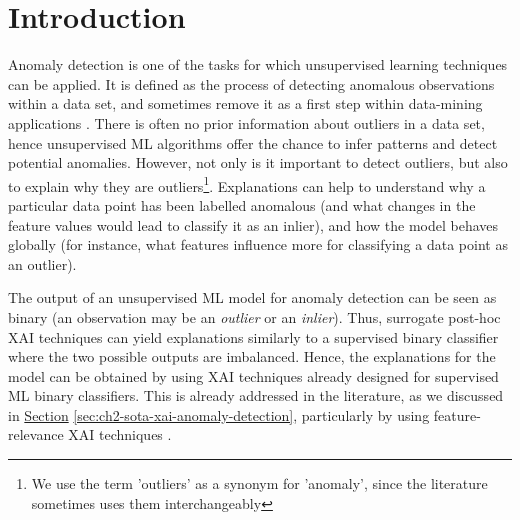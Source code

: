 
\section{Introduction}\label{sec:RuleExtractionIntroduction}
Anomaly detection is one of the tasks for which unsupervised learning techniques can be applied. It is defined as the process of detecting anomalous observations within a data set, and sometimes remove it as a first step within data-mining applications \parencite{hodge2004survey}. There is often no prior information about outliers in a data set, hence unsupervised ML algorithms offer the chance to infer patterns and detect potential anomalies. However, not only is it important to detect outliers, but also to explain why they are outliers\footnote{We use the term 'outliers' as a synonym for 'anomaly', since the literature sometimes uses them interchangeably}. Explanations can help to understand why a particular data point has been labelled anomalous (and what changes in the feature values would lead to classify it as an inlier), and how the model behaves globally (for instance, what features influence more for classifying a data point as an outlier).

The output of an unsupervised ML model for anomaly detection can be seen as binary (an observation may be an \textit{outlier} or an \textit{inlier}). Thus, surrogate post-hoc XAI techniques can yield explanations similarly to a supervised binary classifier where the two possible outputs are imbalanced. Hence, the explanations for the model can be obtained by using XAI techniques already designed for supervised ML binary classifiers. This is already addressed in the literature, as we discussed in \hyperref[sec:ch2-sota-xai-anomaly-detection]{Section} \ref{sec:ch2-sota-xai-anomaly-detection}, particularly by using feature-relevance XAI techniques \parencite{ruff2021unifying, langone2020interpretable}.


